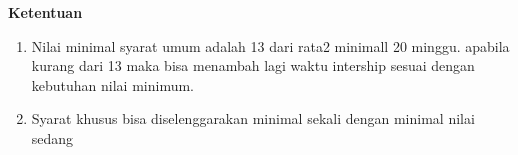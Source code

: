 \textbf {Ketentuan}
\begin{enumerate}
  \item Nilai minimal syarat umum adalah 13 dari rata2 minimall 20 minggu. apabila kurang dari 13 maka bisa menambah lagi waktu intership sesuai dengan kebutuhan nilai minimum.
  \item Syarat khusus bisa diselenggarakan minimal sekali dengan minimal nilai sedang
\end{enumerate} 